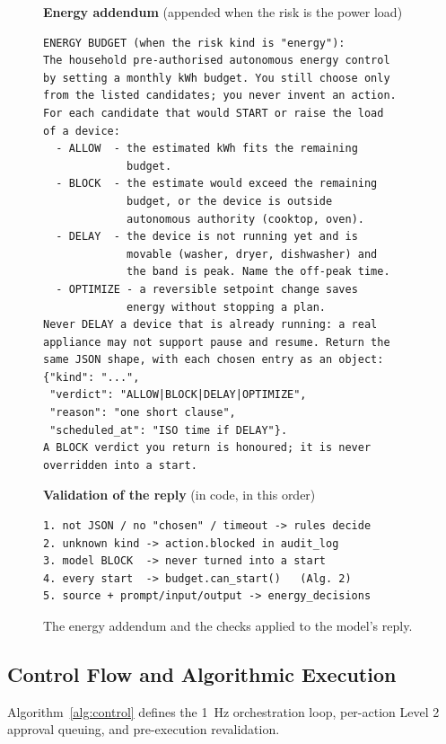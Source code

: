 \documentclass[conference]{IEEEtran}
\begin{document}
\begin{figure}[!t]
\scriptsize
\textbf{Energy addendum} (appended when the risk is the power load)
\begin{verbatim}
ENERGY BUDGET (when the risk kind is "energy"):
The household pre-authorised autonomous energy control
by setting a monthly kWh budget. You still choose only
from the listed candidates; you never invent an action.
For each candidate that would START or raise the load
of a device:
  - ALLOW  - the estimated kWh fits the remaining
             budget.
  - BLOCK  - the estimate would exceed the remaining
             budget, or the device is outside
             autonomous authority (cooktop, oven).
  - DELAY  - the device is not running yet and is
             movable (washer, dryer, dishwasher) and
             the band is peak. Name the off-peak time.
  - OPTIMIZE - a reversible setpoint change saves
             energy without stopping a plan.
Never DELAY a device that is already running: a real
appliance may not support pause and resume. Return the
same JSON shape, with each chosen entry as an object:
{"kind": "...",
 "verdict": "ALLOW|BLOCK|DELAY|OPTIMIZE",
 "reason": "one short clause",
 "scheduled_at": "ISO time if DELAY"}.
A BLOCK verdict you return is honoured; it is never
overridden into a start.
\end{verbatim}
\textbf{Validation of the reply} (in code, in this order)
\begin{verbatim}
1. not JSON / no "chosen" / timeout -> rules decide
2. unknown kind -> action.blocked in audit_log
3. model BLOCK  -> never turned into a start
4. every start  -> budget.can_start()   (Alg. 2)
5. source + prompt/input/output -> energy_decisions
\end{verbatim}
\vspace{-4pt}
\caption{The energy addendum and the checks applied to the model's reply.}
\label{fig:prompt2}
\end{figure}

\subsection{Control Flow and Algorithmic Execution}
Algorithm~\ref{alg:control} defines the 1~Hz orchestration loop, per-action Level 2 approval queuing, and pre-execution revalidation.
\end{document}
